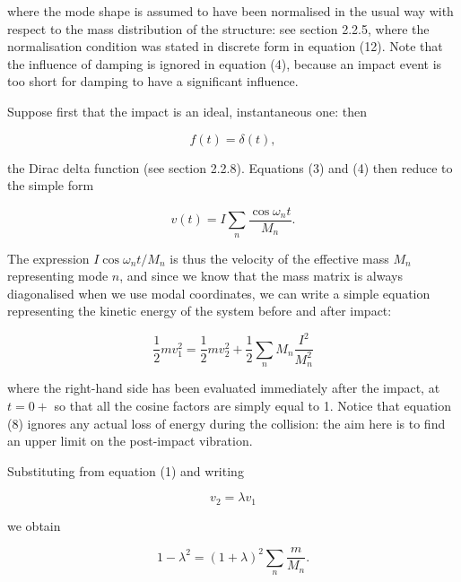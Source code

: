   \noindent{}where the mode shape is assumed to have been normalised in the 
  usual way with respect to the mass distribution of the structure: see section 
  2.2.5, where the normalisation condition was stated in discrete form in 
  equation (12). Note that the influence of damping is ignored in equation (4), 
  because an impact event is too short for damping to have a significant 
  influence. 

  Suppose first that the impact is an ideal, instantaneous one: then 

  \begin{equation*}f(t) = \delta(t), \tag{6}\end{equation*} 

  \noindent{}the Dirac delta function (see section 2.2.8). Equations (3) and 
  (4) then reduce to the simple form 

  \begin{equation*}v(t) = I \sum_n{\dfrac{\cos \omega_n t}{M_n}} . 
  \tag{7}\end{equation*} 

  The expression $I \cos \omega_n t /M_n$ is thus the velocity of the effective 
  mass $M_n$ representing mode $n$, and since we know that the mass matrix is 
  always diagonalised when we use modal coordinates, we can write a simple 
  equation representing the kinetic energy of the system before and after 
  impact: 

  \begin{equation*}\frac{1}{2}m v_1^2 = \frac{1}{2}m v_2^2 +\frac{1}{2} 
  \sum_n{M_n \dfrac{I^2}{M_n^2}} \tag{8}\end{equation*} 

  \noindent{}where the right-hand side has been evaluated immediately after the 
  impact, at $t=0+$ so that all the cosine factors are simply equal to 1. 
  Notice that equation (8) ignores any actual loss of energy during the 
  collision: the aim here is to find an upper limit on the post-impact 
  vibration. 

  Substituting from equation (1) and writing 

  \begin{equation*}v_2= \lambda v_1 \tag{9}\end{equation*} 

  \noindent{}we obtain 

  \begin{equation*}1- \lambda^2 = (1+\lambda)^2 \sum_n{\dfrac{m}{M_n}} . 
  \tag{10}\end{equation*} 

